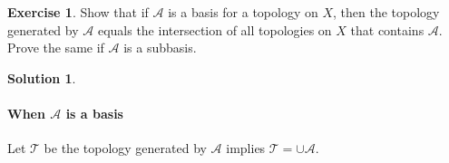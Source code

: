 \documentclass[12pt,reqno]{amsart}
\theoremstyle{plain}
\theoremstyle{definition}
\newtheorem{exer}{Exercise}
\newtheorem*{sol*}{Solution}
\newcommand{\cal}[1]{\mathcal{#1}}
\begin{document}
\begin{exer}
    Show that if $\cal A$ is a basis for a topology on $X$, then the topology generated by $\cal A$ equals the intersection of all topologies on $X$ that contains $\cal A$. Prove the same if $\cal A$ is a subbasis.
\end{exer}
\begin{sol*}
    \phantom{.}\paragraph{\bf When $\cal A$ is a basis} Let $\cal T$ be the topology generated by $\cal A$ implies $\cal T = \cup \cal A$.
\end{sol*}
\end{document}

